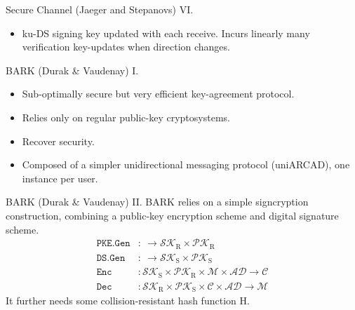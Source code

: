 \documentclass{beamer}
\renewcommand{\t}{\text}
\begin{document}
\begin{frame}{Secure Channel (Jaeger and Stepanovs) VI.}
  \scriptsize
  \begin{minipage}[h]{0.65\textwidth}
      \begin{figure}[ht]
        \centering
        \setlength{\fboxsep}{10pt}
        \scalebox{0.7}{%
        \fbox{%
          
        }
      }
    \end{figure}
    \end{minipage}
  \begin{minipage}[h]{0.34\textwidth}
      \begin{itemize}
      \item ku-DS signing key updated with each receive. Incurs
        linearly many verification key-updates when direction changes.
      \end{itemize}
    \end{minipage}
\end{frame}

\begin{frame}{BARK (Durak \& Vaudenay) I.}
  \begin{itemize}
  \item Sub-optimally secure but very efficient key-agreement protocol.
  \item Relies only on regular public-key cryptosystems.
  \item Recover security.
  \item Composed of a simpler unidirectional messaging protocol (uniARCAD),
    one instance per user.
  \end{itemize}
\end{frame}

\begin{frame}{BARK (Durak \& Vaudenay) II.}
  BARK relies on a simple signcryption construction, combining a public-key
  encryption scheme and digital signature scheme.
  \begin{align*}
    \texttt{PKE.Gen} & : \ \rightarrow \mathcal{SK}_\t{R} \times \mathcal{PK}_\t{R} \\
    \texttt{DS.Gen} & : \ \rightarrow \mathcal{SK}_\t{S} \times \mathcal{PK}_\t{S} \\
    \texttt{Enc} & : \mathcal{SK}_\t{S} \times \mathcal{PK}_\t{R} \times \mathcal{M} \times
                   \mathcal{AD} \rightarrow \mathcal{C} \\
    \texttt{Dec} & : \mathcal{SK}_\t{R} \times \mathcal{PK}_\t{S} \times
  \mathcal{C} \times \mathcal{AD} \rightarrow \mathcal{M}
  \end{align*}
  It further needs some collision-resistant hash function H.
\end{frame}
\end{document}
